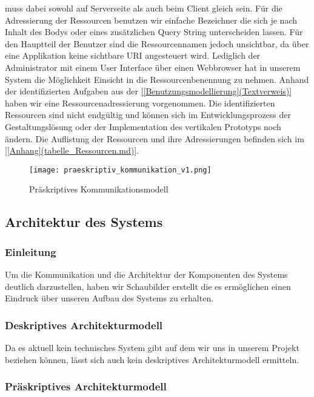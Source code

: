 muss dabei sowohl auf Serverseite als auch beim Client gleich sein.
Für die Adressierung der Ressourcen benutzen wir einfache Bezeichner die sich
je nach Inhalt des Bodys oder eines zusätzlichen Query String unterscheiden
lassen. Für den Hauptteil der Benutzer sind die Ressourcennamen jedoch
unsichtbar, da über eine Applikation keine sichtbare URI angesteuert wird.
Lediglich der Administrator mit einem User Interface über einen Webbrowser hat
in unserem System die Möglichkeit Einsicht in die Ressourcenbenennung zu nehmen.
Anhand der identifizierten Aufgaben aus der \ref{[Benutzungsmodellierung](Textverweis)}
haben wir eine Ressourcenadressierung vorgenommen. Die identifizierten
Ressourcen sind nicht endgültig und können sich im Entwicklungsprozess der
Gestaltungslösung oder der Implementation des vertikalen Prototyps noch ändern.
Die Auflistung der Ressourcen und ihre Adressierungen befinden sich im \ref{[Anhang](tabelle_Ressourcen.md)}.

\begin{figure}
	\centering
	\texttt{[image: praeskriptiv\_kommunikation\_v1.png]}
	\caption{Präskriptives Kommunikationsmodell}
\end{figure}


\subsection{Architektur des Systems}
\label{sec:Architektur des Systems}

\subsubsection{Einleitung}
\label{sec:Architektur des Systems Einleitung}
Um die Kommunikation und die Architektur der Komponenten des Systems deutlich
darzustellen, haben wir Schaubilder erstellt die es ermöglichen einen Eindruck
über unseren Aufbau des Systems zu erhalten.

\subsubsection{Deskriptives Architekturmodell}
\label{sec:Deskriptives Architekturmodell}

Da es aktuell kein technisches System gibt auf dem wir uns in unserem Projekt
beziehen können, lässt sich auch kein deskriptives Architekturmodell ermitteln.

\subsubsection{Präskriptives Architekturmodell}
\label{sec:Präskriptives Architekturmodell}

